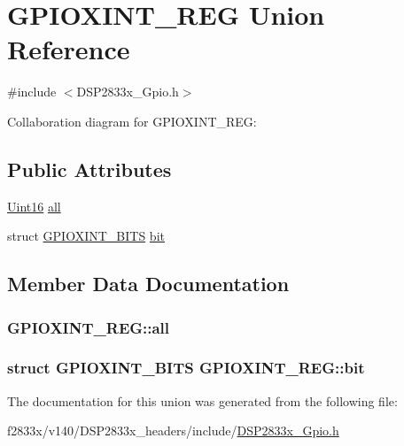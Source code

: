 \hypertarget{union_g_p_i_o_x_i_n_t___r_e_g}{}\section{G\+P\+I\+O\+X\+I\+N\+T\+\_\+\+R\+E\+G Union Reference}
\label{union_g_p_i_o_x_i_n_t___r_e_g}


{\ttfamily \#include $<$D\+S\+P2833x\+\_\+\+Gpio.\+h$>$}



Collaboration diagram for G\+P\+I\+O\+X\+I\+N\+T\+\_\+\+R\+E\+G\+:
\subsection*{Public Attributes}
\begin{DoxyCompactItemize}
\item 
\hyperlink{_d_s_p2833x___device_8h_a59a9f6be4562c327cbfb4f7e8e18f08b}{Uint16} \hyperlink{union_g_p_i_o_x_i_n_t___r_e_g_a567dc5e26b43cf9ea4728c755c78dc84}{all}
\item 
struct \hyperlink{struct_g_p_i_o_x_i_n_t___b_i_t_s}{G\+P\+I\+O\+X\+I\+N\+T\+\_\+\+B\+I\+T\+S} \hyperlink{union_g_p_i_o_x_i_n_t___r_e_g_a033840a01a0c9470605ada223c057928}{bit}
\end{DoxyCompactItemize}


\subsection{Member Data Documentation}
\hypertarget{union_g_p_i_o_x_i_n_t___r_e_g_a567dc5e26b43cf9ea4728c755c78dc84}{}
\subsubsection[{all}]{ G\+P\+I\+O\+X\+I\+N\+T\+\_\+\+R\+E\+G\+::all}\label{union_g_p_i_o_x_i_n_t___r_e_g_a567dc5e26b43cf9ea4728c755c78dc84}
\hypertarget{union_g_p_i_o_x_i_n_t___r_e_g_a033840a01a0c9470605ada223c057928}{}
\subsubsection[{bit}]{\setlength{\rightskip}{0pt plus 5cm}struct {\bf G\+P\+I\+O\+X\+I\+N\+T\+\_\+\+B\+I\+T\+S} G\+P\+I\+O\+X\+I\+N\+T\+\_\+\+R\+E\+G\+::bit}\label{union_g_p_i_o_x_i_n_t___r_e_g_a033840a01a0c9470605ada223c057928}


The documentation for this union was generated from the following file\+:\begin{DoxyCompactItemize}
\item 
f2833x/v140/\+D\+S\+P2833x\+\_\+headers/include/\hyperlink{_d_s_p2833x___gpio_8h}{D\+S\+P2833x\+\_\+\+Gpio.\+h}\end{DoxyCompactItemize}
